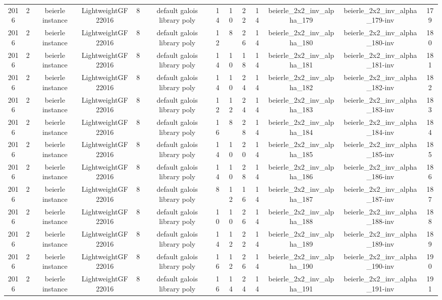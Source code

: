 \begin{tabular}{c c c c c c c c c c c c c}
2016 & 2 & beierle instance & LightweightGF22016 & 8 & default galois library poly & 14 & 10 & 22 & 14 & beierle_2x2_inv_alpha_179 & beierle_2x2_inv_alpha_179-inv & 179 \\
2016 & 2 & beierle instance & LightweightGF22016 & 8 & default galois library poly & 12 & 8 & 26 & 14 & beierle_2x2_inv_alpha_180 & beierle_2x2_inv_alpha_180-inv & 180 \\
2016 & 2 & beierle instance & LightweightGF22016 & 8 & default galois library poly & 14 & 10 & 18 & 14 & beierle_2x2_inv_alpha_181 & beierle_2x2_inv_alpha_181-inv & 181 \\
2016 & 2 & beierle instance & LightweightGF22016 & 8 & default galois library poly & 14 & 10 & 24 & 14 & beierle_2x2_inv_alpha_182 & beierle_2x2_inv_alpha_182-inv & 182 \\
2016 & 2 & beierle instance & LightweightGF22016 & 8 & default galois library poly & 12 & 12 & 24 & 14 & beierle_2x2_inv_alpha_183 & beierle_2x2_inv_alpha_183-inv & 183 \\
2016 & 2 & beierle instance & LightweightGF22016 & 8 & default galois library poly & 16 & 8 & 28 & 14 & beierle_2x2_inv_alpha_184 & beierle_2x2_inv_alpha_184-inv & 184 \\
2016 & 2 & beierle instance & LightweightGF22016 & 8 & default galois library poly & 14 & 10 & 20 & 14 & beierle_2x2_inv_alpha_185 & beierle_2x2_inv_alpha_185-inv & 185 \\
2016 & 2 & beierle instance & LightweightGF22016 & 8 & default galois library poly & 14 & 10 & 28 & 14 & beierle_2x2_inv_alpha_186 & beierle_2x2_inv_alpha_186-inv & 186 \\
2016 & 2 & beierle instance & LightweightGF22016 & 8 & default galois library poly & 8 & 12 & 16 & 14 & beierle_2x2_inv_alpha_187 & beierle_2x2_inv_alpha_187-inv & 187 \\
2016 & 2 & beierle instance & LightweightGF22016 & 8 & default galois library poly & 10 & 10 & 26 & 14 & beierle_2x2_inv_alpha_188 & beierle_2x2_inv_alpha_188-inv & 188 \\
2016 & 2 & beierle instance & LightweightGF22016 & 8 & default galois library poly & 14 & 12 & 22 & 14 & beierle_2x2_inv_alpha_189 & beierle_2x2_inv_alpha_189-inv & 189 \\
2016 & 2 & beierle instance & LightweightGF22016 & 8 & default galois library poly & 16 & 12 & 26 & 14 & beierle_2x2_inv_alpha_190 & beierle_2x2_inv_alpha_190-inv & 190 \\
2016 & 2 & beierle instance & LightweightGF22016 & 8 & default galois library poly & 16 & 14 & 24 & 14 & beierle_2x2_inv_alpha_191 & beierle_2x2_inv_alpha_191-inv & 191 \\

\end{tabular}
